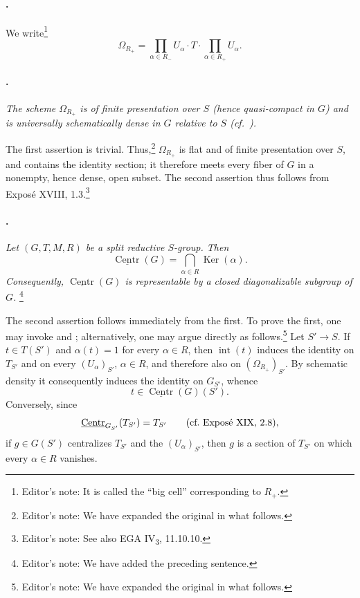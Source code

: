 \paragraph{.}
We write\footnote{Editor's note: It is called the ``big cell''
corresponding to \(R_+\).}
\[
  \Omega_{R_+}
  =
  \prod_{\alpha\in R_-}U_\alpha
  \mathbin{\cdot}T\mathbin{\cdot}
  \prod_{\alpha\in R_+}U_\alpha.
\]

\paragraph{.}
\textit{The scheme \(\Omega_{R_+}\) is of finite presentation over
\(S\) \textup{(hence quasi-compact in \(G\))} and is universally
schematically dense in \(G\) relative to \(S\)
\textup{(cf.\ )}.}

The first assertion is trivial. Thus,\footnote{Editor's note: We
have expanded the original in what follows.}
\(\Omega_{R_+}\) is flat and of finite presentation over \(S\), and
contains the identity section; it therefore meets every fiber of
\(G\) in a nonempty, hence dense, open subset. The second assertion
thus follows from Exposé XVIII, 1.3.\footnote{Editor's note: See also
EGA IV\textsubscript{3}, 11.10.10.}

\paragraph{.}
\textit{Let \((G,T,M,R)\) be a split reductive \(S\)-group. Then}
\[
  \underline{\operatorname{Centr}}(G)
  =
  \bigcap_{\alpha\in R}\operatorname{Ker}(\alpha).
\]
\textit{Consequently,
\(\underline{\operatorname{Centr}}(G)\) is representable by a
closed diagonalizable subgroup of \(G\).}
\footnote{Editor's note: We have added the preceding sentence.}

The second assertion follows immediately from the first. To prove
the first, one may invoke  and ; alternatively,
one may argue directly as follows.\footnote{Editor's note: We have
expanded the original in what follows.}
Let \(S'\to S\). If \(t\in T(S')\) and \(\alpha(t)=1\) for every
\(\alpha\in R\), then \(\operatorname{int}(t)\) induces the identity
on \(T_{S'}\) and on every \((U_\alpha)_{S'}\), \(\alpha\in R\),
and therefore also on \((\Omega_{R_+})_{S'}\). By schematic density
it consequently induces the identity on \(G_{S'}\), whence
\[
  t\in\underline{\operatorname{Centr}}(G)(S').
\]
Conversely, since
\[
  \underline{\operatorname{Centr}}_{G_{S'}}(T_{S'})
  =
  T_{S'}
  \qquad\textup{(cf.\ Exposé XIX, 2.8)},
\]
if \(g\in G(S')\) centralizes \(T_{S'}\) and the
\((U_\alpha)_{S'}\), then \(g\) is a section of \(T_{S'}\) on
which every \(\alpha\in R\) vanishes.

